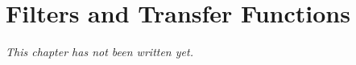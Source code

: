 \chapter{Filters and Transfer Functions}\label{ch:b1:filters-transfer-functions}


\emph{This chapter has not been written yet.}
